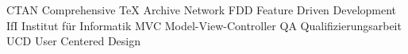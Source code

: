 %
% 
% 
% 
% 
% 
% 
% 

  {CTAN}  {Comprehensive TeX Archive Network}
   {FDD}   {Feature Driven Development}
   {IfI}   {Institut für Informatik}
   {MVC}   {Model-View-Controller}
    {QA}    {Qualifizierungsarbeit}
   {UCD}   {User Centered Design}

